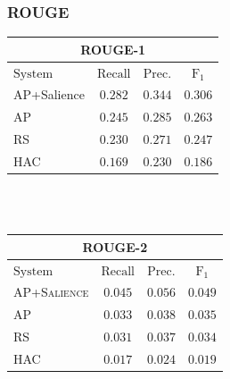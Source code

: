 \documentclass{beamer}
\begin{document}
\begin{frame}
    \frametitle{ROUGE}
\begin{table}[h]
\centering
\begin{tabular}{l c c c}
\multicolumn{4}{c}{ROUGE-1}\\
\hline
\hline
$\mathrm{System}$ & $\mathrm{Recall}$ & $\mathrm{Prec.}$ & $\mathrm{F}_1$\\
[0.5ex]
\hline
AP+Salience & $\mathbf{0.282}$ & $\mathbf{0.344}$ & $\mathbf{0.306}$\\
AP          & $0.245$ & $0.285$ & $0.263$ \\
RS          & $0.230$ & $0.271$ & $0.247$ \\
HAC         & $0.169$ & $0.230$ & $0.186$ \\
\hline %
\end{tabular}
~\\[1ex]
~\\
\begin{tabular}{l c c c}
\multicolumn{4}{c}{ROUGE-2}\\
\hline
\hline
$\mathrm{System}$ & $\mathrm{Recall}$ & $\mathrm{Prec.}$ & $\mathrm{F}_1$\\[0.5ex]
\hline
\textsc{AP+Salience} & $\mathbf{0.045}$ & $\mathbf{0.056}$ & $\mathbf{0.049}$\\
\textsc{AP}          & $0.033$ & $0.038$ & $0.035$ \\
\textsc{RS}          & $0.031$ & $0.037$ & $0.034$ \\
\textsc{HAC}         & $0.017$ & $0.024$ & $0.019$ \\
\hline %
\end{tabular}
\end{table}
\end{frame}
\end{document}
